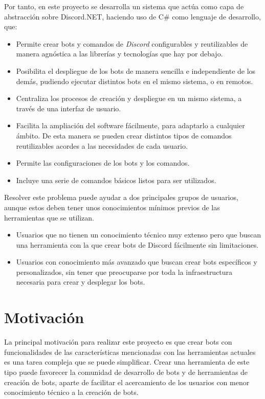 Por tanto, en este proyecto se desarrolla un sistema que actúa como capa de abstracción sobre Discord.NET, haciendo uso de C\# como lenguaje de desarrollo, que:

\begin{itemize}
	\item Permite crear bots y comandos de \textit{Discord} configurables y reutilizables de manera agnóstica a las librerías y tecnologías que hay por debajo.
	\item Posibilita el despliegue de los bots de manera sencilla e independiente de los demás, pudiendo ejecutar distintos bots en el mismo sistema, o en remotos.
	\item Centraliza los procesos de creación y despliegue en un mismo sistema, a través de una interfaz de usuario.
	\item Facilita la ampliación del software fácilmente, para adaptarlo a cualquier ámbito. De esta manera se pueden crear distintos tipos de comandos reutilizables acordes a las necesidades de cada usuario.
	\item Permite las configuraciones de los bots y los comandos.
	\item Incluye una serie de comandos básicos listos para ser utilizados.
\end{itemize}

Resolver este problema puede ayudar a dos principales grupos de usuarios, aunque estos deben tener unos conocimientos mínimos previos de las herramientas que se utilizan.

\begin{itemize}
	\item Usuarios que no tienen un conocimiento técnico muy extenso pero que buscan una herramienta con la que crear bots de Discord fácilmente sin limitaciones.
	\item Usuarios con conocimiento más avanzado que buscan crear bots específicos y personalizados, sin tener que preocuparse por toda la infraestructura necesaria para crear y desplegar los bots.
\end{itemize}

\section{Motivación}

La principal motivación para realizar este proyecto es que crear bots con funcionalidades de las características mencionadas con las herramientas actuales es una tarea compleja que se puede simplificar. Crear una herramienta de este tipo puede favorecer la comunidad de desarrollo de bots y de herramientas de creación de bots, aparte de facilitar el acercamiento de los usuarios con menor conocimiento técnico a la creación de bots.


